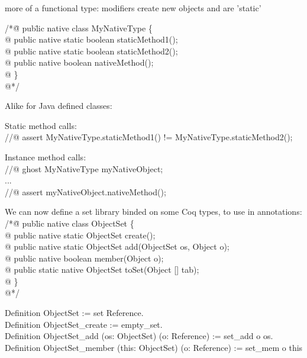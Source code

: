 \item more of a functional type: modifiers create new objects and are 'static'
\elist
\elist
{}\small
\begin{tabbing}
/*\=@ pub\=lic {\purple native} class MyNativeType \{\+\\
 @\> public  {\purple native} static boolean staticMethod1();\\
 @\> public  {\purple native} static boolean staticMethod2();\\
   @\> public {\purple  native} boolean nativeMethod();\\
  @ \}\\
  @*/
\end{tabbing}
Alike for Java defined classes:
\blist
\item Static method calls:\\
//@  {\purple assert} MyNativeType.staticMethod1() != MyNativeType.staticMethod2();
\item Instance method calls:\\
//@  {\purple ghost} MyNativeType myNativeObject;\\
...\\
//@  {\purple assert} myNativeObject.nativeMethod();
\elist
{}
\small
\begin{tabbing}
We can now define a set library binded on some  {\purple Coq types}, 
to use in annotations:\\
/*\=@ pub\=lic native class ObjectSet \{\+\\
  @\> public native static ObjectSet create();\\
   @\> public native static ObjectSet add(ObjectSet os, Object o);\\
   @\> public native boolean member(Object o);\\
  @ \> public static native ObjectSet toSet(Object [] tab);\\
  @ \}\\
  @*/
\end{tabbing}
\begin{tabbing}
Definition ObjectSet := set Reference. \\
Definition ObjectSet\_create := empty\_set.\\
Definition ObjectSet\_add (os: ObjectSet) (o: Reference) :=  set\_add o os.\\
 Definition ObjectSet\_member (this: ObjectSet) (o: Reference) := set\_mem o this
\end{tabbing}

